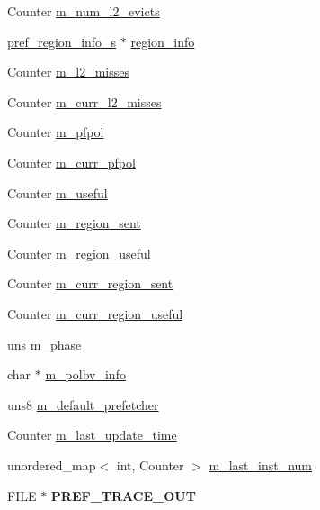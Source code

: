 \begin{DoxyCompactItemize}
Counter \hyperlink{classhwp__common__c_ac6a0c9f2b85988328933352cae406531}{m\_\-num\_\-l2\_\-evicts}
\item 
\hyperlink{structpref__region__info__s}{pref\_\-region\_\-info\_\-s} $\ast$ \hyperlink{classhwp__common__c_a0f572e4a38d137dcd255b8f822cd2250}{region\_\-info}
\item 
Counter \hyperlink{classhwp__common__c_a57e9422811b855c6de9a041c1f7d3045}{m\_\-l2\_\-misses}
\item 
Counter \hyperlink{classhwp__common__c_a0774007b330ea6bcb63f27e0bb189b66}{m\_\-curr\_\-l2\_\-misses}
\item 
Counter \hyperlink{classhwp__common__c_abbf386422494c8ae2e60c1d2cafd5c04}{m\_\-pfpol}
\item 
Counter \hyperlink{classhwp__common__c_ac018f13a00b71a4d7570403f3c27c732}{m\_\-curr\_\-pfpol}
\item 
Counter \hyperlink{classhwp__common__c_ad6cc891ec48a9d169da339e4c234a780}{m\_\-useful}
\item 
Counter \hyperlink{classhwp__common__c_aadcc7e3de1eb3714564ab09503891baf}{m\_\-region\_\-sent}
\item 
Counter \hyperlink{classhwp__common__c_ab2549a1bf12d013b25728e3424120bf3}{m\_\-region\_\-useful}
\item 
Counter \hyperlink{classhwp__common__c_a0bcd28288b55a82b3d7ed606482e6343}{m\_\-curr\_\-region\_\-sent}
\item 
Counter \hyperlink{classhwp__common__c_a8cafbef3d36489af200e76b1e9c5b761}{m\_\-curr\_\-region\_\-useful}
\item 
uns \hyperlink{classhwp__common__c_a6e07cfc36d0a0f955a347608acf7681c}{m\_\-phase}
\item 
char $\ast$ \hyperlink{classhwp__common__c_a391080d4f8aa02cba02bd177b0538ab3}{m\_\-polbv\_\-info}
\item 
uns8 \hyperlink{classhwp__common__c_a89f3976f4e8523d23045431ad4e02569}{m\_\-default\_\-prefetcher}
\item 
Counter \hyperlink{classhwp__common__c_a0b833904c9a0040d1a2c7b257a2864da}{m\_\-last\_\-update\_\-time}
\item 
unordered\_\-map$<$ int, Counter $>$ \hyperlink{classhwp__common__c_ad87e4460ed484fc1657efb73917913c7}{m\_\-last\_\-inst\_\-num}
\item 
\hypertarget{classhwp__common__c_a494f09d573b87b4e01cd6899a7e3cc89}{
FILE $\ast$ {\bfseries PREF\_\-TRACE\_\-OUT}}
\label{classhwp__common__c_a494f09d573b87b4e01cd6899a7e3cc89}


\end{DoxyCompactItemize}
